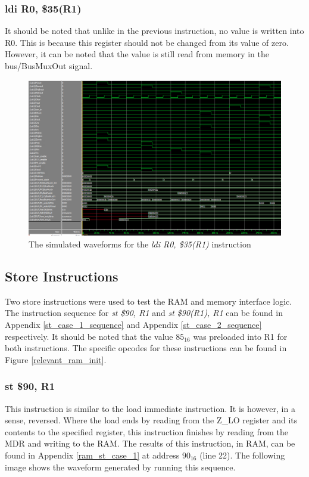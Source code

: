 \documentclass{article}
\begin{document}
        \subsubsection{ldi R0, \$35(R1)}
            It should be noted that unlike in the previous instruction, no value is written into R0. This is because this register should not be changed from its value of zero. However, it can be noted that the value is still read from memory in the bus/BusMuxOut signal.
            \begin{figure}[h!]
                \begin{center}
                    \includegraphics[width=15cm]{ldi_case_2_wave.png}
                    \caption{The simulated waveforms for the \emph{ldi R0, \$35(R1)} instruction}
                \end{center}
            \end{figure}

    \subsection{Store Instructions}
        Two store instructions were used to test the RAM and memory interface logic. The instruction sequence for \emph{st \$90, R1} and \emph{st \$90(R1), R1} can be found in Appendix \ref{st_case_1_sequence} and Appendix \ref{st_case_2_sequence} respectively. It should be noted that the value $85_{16}$ was preloaded into R1 for both instructions. The specific opcodes for these instructions can be found in Figure \ref{relevant_ram_init}. 
        
        \subsubsection{st \$90, R1}
            This instruction is similar to the load immediate instruction. It is however, in a sense, reversed. Where the load ends by reading from the Z\_LO register and its contents to the specified register, this instruction finishes by reading from the MDR and writing to the RAM. The results of this instruction, in RAM, can be found in Appendix \ref{ram_st_case_1} at address $90_{16}$ (line 22). The following image shows the waveform generated by running this sequence. 
\end{document}
